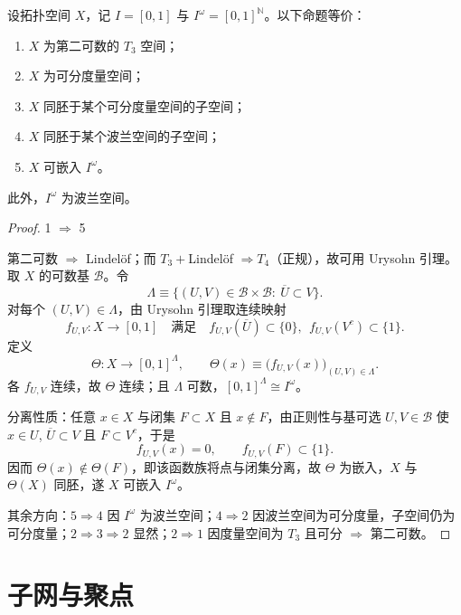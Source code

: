 \documentclass[lang=cn,a4paper,newtx,figureplace=section,tableplace=section]{elegantbook}
\begin{document}
 \begin{theorem}\label{thm:urysohn-embedding}
  设拓扑空间 $X$，记 $I=[0,1]$ 与 $I^{\omega}=[0,1]^{\mathbb N}$。以下命题等价：
  \begin{enumerate}
    \item $X$ 为第二可数的 $T_3$ 空间；
    \item $X$ 为可分度量空间；
    \item $X$ 同胚于某个可分度量空间的子空间；
    \item $X$ 同胚于某个波兰空间的子空间；
    \item $X$ 可嵌入 $I^{\omega}$。
  \end{enumerate}
  此外，$I^{\omega}$ 为波兰空间。
  \end{theorem}
  \begin{proof}

    1 $\Rightarrow$ 5
    
  第二可数 $\Rightarrow$ Lindel\"{o}f；而 $T_3+$Lindel\"{o}f $\Rightarrow T_4$（正规），故可用 Urysohn 引理。
  取 $X$ 的可数基 $\mathcal B$。令
  \[
    \Lambda\equiv\{(U,V)\in\mathcal B\times\mathcal B:\ \overline{U}\subset V\}.
  \]
  对每个 $(U,V)\in\Lambda$，由 Urysohn 引理取连续映射
  \[
    f_{U,V}:X\to[0,1]\quad\text{满足}\quad f_{U,V}(\overline U)\subset\{0\},\ \ f_{U,V}(V^{c})\subset\{1\}.
  \]
  定义
  \[
    \Theta:X\longrightarrow [0,1]^{\Lambda},\qquad \Theta(x)\equiv\big(f_{U,V}(x)\big)_{(U,V)\in\Lambda}.
  \]
  各 $f_{U,V}$ 连续，故 $\Theta$ 连续；且 $\Lambda$ 可数，$[0,1]^{\Lambda}\cong I^{\omega}$。
  
  分离性质：任意 $x\in X$ 与闭集 $F\subset X$ 且 $x\notin F$，由正则性与基可选 $U,V\in\mathcal B$ 使 $x\in U$, $\overline U\subset V$ 且 $F\subset V^{c}$，于是
  \[
    f_{U,V}(x)=0,\qquad f_{U,V}(F)\subset\{1\}.
  \]
  因而 $\Theta(x)\notin \Theta(F)$，即该函数族将点与闭集分离，故 $\Theta$ 为嵌入，$X$ 与 $\Theta(X)$ 同胚，遂 $X$ 可嵌入 $I^{\omega}$。
  
  其余方向：$5\Rightarrow4$ 因 $I^{\omega}$ 为波兰空间；$4\Rightarrow2$ 因波兰空间为可分度量，子空间仍为可分度量；$2\Rightarrow3\Rightarrow2$ 显然；$2\Rightarrow1$ 因度量空间为 $T_3$ 且可分 $\Rightarrow$ 第二可数。
  \end{proof}
  

  
  \section{子网与聚点}
 
\end{document}
